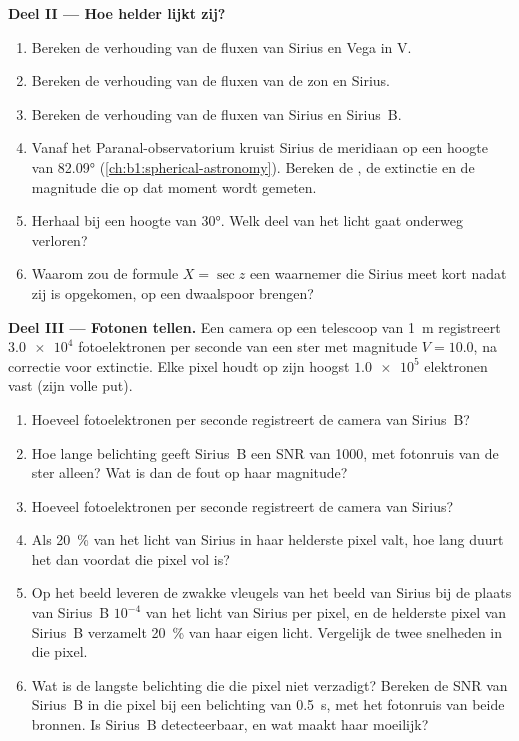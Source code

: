 \begin{problem}
\medskip
\noindent\textbf{Deel II --- Hoe helder lijkt zij?}
\begin{enumerate}[resume]
  \item Bereken de verhouding van de fluxen van Sirius en Vega in V.
  \item Bereken de verhouding van de fluxen van de zon en Sirius.
  \item Bereken de verhouding van de fluxen van Sirius en Sirius~B.
  \item Vanaf het Paranal-observatorium kruist Sirius de meridiaan op een hoogte van \ang{82.09}
        (\cref{ch:b1:spherical-astronomy}). Bereken de , de extinctie en de magnitude die
        op dat moment wordt gemeten.
  \item Herhaal bij een hoogte van \ang{30}. Welk deel van het licht gaat onderweg verloren?
  \item Waarom zou de formule $X = \sec z$ een waarnemer die Sirius meet kort nadat zij is opgekomen,
        op een dwaalspoor brengen?
\end{enumerate}

\medskip
\noindent\textbf{Deel III --- Fotonen tellen.}
Een camera op een telescoop van \qty{1}{m} registreert $\num{3.0e4}$ fotoelektronen per seconde van
een ster met magnitude $V = 10.0$, na correctie voor extinctie. Elke pixel houdt op zijn hoogst
$\num{1.0e5}$ elektronen vast (zijn volle put).
\begin{enumerate}[resume]
  \item Hoeveel fotoelektronen per seconde registreert de camera van Sirius~B?
  \item Hoe lange belichting geeft Sirius~B een SNR van 1000, met fotonruis van de ster alleen? Wat is
        dan de fout op haar magnitude?
  \item Hoeveel fotoelektronen per seconde registreert de camera van Sirius?
  \item Als \qty{20}{\percent} van het licht van Sirius in haar helderste pixel valt, hoe lang duurt het
        dan voordat die pixel vol is?
  \item Op het beeld leveren de zwakke vleugels van het beeld van Sirius bij de plaats van Sirius~B
        $10^{-4}$ van het licht van Sirius per pixel, en de helderste pixel van Sirius~B verzamelt
        \qty{20}{\percent} van haar eigen licht. Vergelijk de twee snelheden in die pixel.
  \item Wat is de langste belichting die die pixel niet verzadigt? Bereken de SNR van Sirius~B in die
        pixel bij een belichting van \qty{0.5}{s}, met het fotonruis van beide bronnen. Is Sirius~B
        detecteerbaar, en wat maakt haar moeilijk?
\end{enumerate}


\end{problem}
